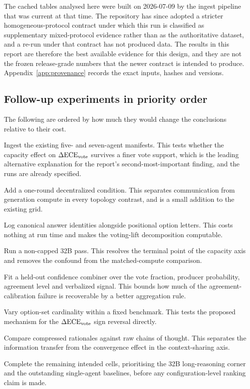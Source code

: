 The cached tables analysed here were built on 2026-07-09 by the ingest pipeline that was
current at that time. The repository has since adopted a stricter homogeneous-protocol
contract under which this run is classified as supplementary mixed-protocol evidence rather
than as the authoritative dataset, and a re-run under that contract has not produced data.
The results in this report are therefore the best available evidence for this design, and
they are not the frozen release-grade numbers that the newer contract is intended to
produce. Appendix~\ref{app:provenance} records the exact inputs, hashes and versions.

\subsection{Follow-up experiments in priority order}

The following are ordered by how much they would change the conclusions relative to their
cost.

Ingest the existing five- and seven-agent manifests. This tests whether the capacity effect
on $\Delta\mathrm{ECE}_{\mathrm{vote}}$ survives a finer vote support, which is the leading alternative explanation for
the report's second-most-important finding, and the runs are already specified.

Add a one-round decentralized condition. This separates communication from generation
compute in every topology contrast, and is a small addition to the existing grid.

Log canonical answer identities alongside positional option letters. This costs nothing at
run time and makes the voting-lift decomposition computable.

Run a non-capped 32B pass. This resolves the terminal point of the capacity axis and removes
the confound from the matched-compute comparison.

Fit a held-out confidence combiner over the vote fraction, producer probability, agreement
level and verbalized signal. This bounds how much of the agreement-calibration failure is
recoverable by a better aggregation rule.

Vary option-set cardinality within a fixed benchmark. This tests the proposed mechanism for
the $\Delta\mathrm{ECE}_{\mathrm{vote}}$ sign reversal directly.

Compare compressed rationales against raw chains of thought. This separates the information
transfer from the convergence effect in the context-sharing axis.

Complete the remaining intended cells, prioritising the 32B long-reasoning corner and the
outstanding single-agent baselines, before any configuration-level ranking claim is made.
